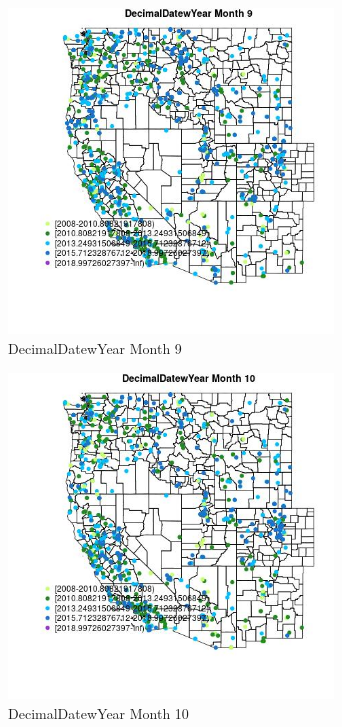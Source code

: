 \begin{figure} 
\centering  
\includegraphics[width=0.77\textwidth]{Code_Outputs/Report_ML_input_PM25_Step4_part_e_de_duplicated_aveswNAs_MapObsMo9DecimalDatewYear.jpg} 
\caption{\label{fig:Report_ML_input_PM25_Step4_part_e_de_duplicated_aveswNAsMapObsMo9DecimalDatewYear}DecimalDatewYear Month 9} 
\end{figure} 
 

\begin{figure} 
\centering  
\includegraphics[width=0.77\textwidth]{Code_Outputs/Report_ML_input_PM25_Step4_part_e_de_duplicated_aveswNAs_MapObsMo10DecimalDatewYear.jpg} 
\caption{\label{fig:Report_ML_input_PM25_Step4_part_e_de_duplicated_aveswNAsMapObsMo10DecimalDatewYear}DecimalDatewYear Month 10} 
\end{figure} 
 

